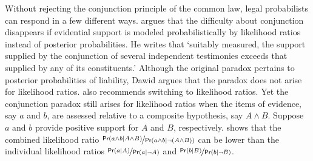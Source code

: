 \documentclass{article}
\newcommand{\pr}{\mathsf{Pr}}
\begin{document}
Without rejecting the conjunction principle of the common law, legal probabilists can respond  in a few different ways. 
\citet{dawid1987difficulty} 
argues that the difficulty about conjunction disappears if evidential support is modeled probabilistically by likelihood ratios instead of posterior probabilities. 
He writes that 
`suitably measured, the support supplied by the conjunction of several independent testimonies exceeds that supplied by any of its constituents.' %
 Although the original paradox pertains to  posterior probabilities of liability, Dawid argues that the  paradox does not arise for likelihood ratios. %
 \cite{garbolino2014} also recommends switching to likelihood ratios. %
 Yet the conjunction paradox   still arises for likelihood ratios 
when the items of evidence, say $a$ and $b$, are assessed relative to a composite hypothesis, say $A \wedge B$. Suppose $a$ and $b$ provide positive support for  $A$ and $B$, respectively.  
 \cite{Urbaniak2019standards2} shows that the combined likelihood ratio $\nicefrac{\pr(a \wedge b | A\wedge B)}{\pr(a\wedge b | \neg (A \wedge B))}$ can be lower than the individual likelihood ratios $\nicefrac{\pr(a | A)}{\pr(a | \neg A)}$ and $\nicefrac{\pr(b | B)}{\pr(b | \neg B)}$.
\end{document}
